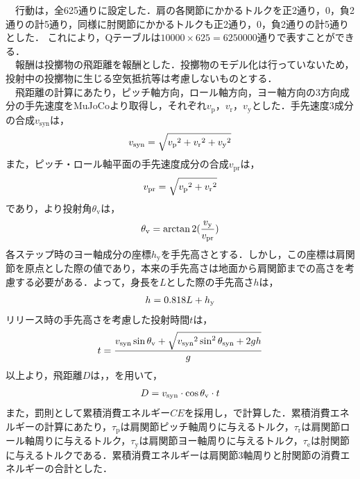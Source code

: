 　行動は，全625通りに設定した．肩の各関節にかかるトルクを正2通り，0，負2通りの計5通り，同様に肘関節にかかるトルクも正2通り，0，負2通りの計5通りとした．
これにより，Qテーブルは$10000 \times 625=6250000$通りで表すことができる．\\
　報酬は投擲物の飛距離を報酬とした．投擲物のモデル化は行っていないため，投射中の投擲物に生じる空気抵抗等は考慮しないものとする．\\
　飛距離の計算にあたり，ピッチ軸方向，ロール軸方向，ヨー軸方向の3方向成分の手先速度をMuJoCoより取得し，それぞれ$v_{\mathrm{p}}$，$v_{\mathrm{r}}$，$v_{\mathrm{y}}$とした．手先速度3成分の合成$v_{\mathrm{syn}}$は，
\begin{eqnarray}
  \equlabel{3}
  v_{\mathrm{syn}} = \sqrt{{v_{\mathrm{p}}}^{2} + {v_{\mathrm{r}}}^{2} + {v_{\mathrm{y}}}^{2}}
\end{eqnarray}
また，ピッチ・ロール軸平面の手先速度成分の合成$v_{\mathrm{pr}}$は，
\begin{eqnarray}
  \equlabel{4}
  v_{\mathrm{pr}} = \sqrt{{v_{\mathrm{p}}}^{2} + {v_{\mathrm{r}}}^{2}}
\end{eqnarray}
であり，より投射角$\theta_{\mathrm{v}}$は，
\begin{eqnarray}
  \equlabel{5}
  \theta_{\mathrm{v}} = \arctan2(\frac{v_{\mathrm{y}}}{v_{\mathrm{pr}}})
\end{eqnarray}
各ステップ時のヨー軸成分の座標$h_{\mathrm{y}}$を手先高さとする．しかし，この座標は肩関節を原点とした際の値であり，本来の手先高さは地面から肩関節までの高さを考慮する必要がある．よって，身長を$L$とした際の手先高さ$h$は，
\begin{eqnarray}
  \equlabel{6}
  h = 0.818L + h_{\mathrm{y}}
\end{eqnarray}
リリース時の手先高さを考慮した投射時間$t$は，
\begin{eqnarray}
  \equlabel{7}
  t = \frac{v_{\mathrm{syn}}\sin\theta_{\mathrm{v}} + \sqrt{{v_{\mathrm{syn}}}^2\sin^2\theta_{\mathrm{syn}} + 2gh}}{g}
\end{eqnarray}
以上より，飛距離$D$は，，を用いて，
\begin{eqnarray}
  \equlabel{8}
  D = v_{\mathrm{syn}} \cdot \cos\theta_{\mathrm{v}} \cdot t
\end{eqnarray}
また，罰則として累積消費エネルギー$CE$を採用し，で計算した．累積消費エネルギーの計算にあたり，$\tau_{\mathrm{p}}$は肩関節ピッチ軸周りに与えるトルク，$\tau_{\mathrm{r}}$は肩関節ロール軸周りに与えるトルク，$\tau_{\mathrm{y}}$は肩関節ヨー軸周りに与えるトルク，$\tau_{\mathrm{e}}$は肘関節に与えるトルクである．累積消費エネルギーは肩関節3軸周りと肘関節の消費エネルギーの合計とした．

